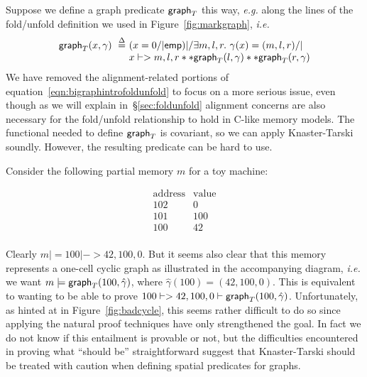 Suppose we define a graph predicate $\mathsf{graph}_T$ this way, \emph{e.g.} along the lines of the fold/unfold definition we used in Figure~\ref{fig:markgraph}, \emph{i.e.}
\[
\begin{array}{@{}l@{}l@{}}
\graphkt(x, \gamma) ~ \stackrel{\Delta}{=} ~ & (x = 0 /| \p{emp}) |/ \exists m,l,r.~ \gamma(x)=(m,l,r) /| \null \\
& x |-> m,l,r ** \graphkt(l, \gamma) ** \graphkt(r, \gamma)
\end{array}
\]
We have removed the alignment-related portions of equation~\eqref{eqn:bigraphintrofoldunfold} to focus on a more serious issue, even though as we will explain in~\S\ref{sec:foldunfold} alignment concerns are also necessary for the fold/unfold relationship to hold in C-like memory models.  The functional needed to define $\mathsf{graph}_T$ is covariant, so we can apply Knaster-Tarski soundly.  However, the resulting predicate can be hard to use.

Consider the following partial memory $m$ for a toy machine:

\begin{minipage}{.19\textwidth}
\[
\begin{array}{l|l}
\textrm{address} & \textrm{value} \\
\hline
102 & 0 \\
101 & 100 \\
100 & 42 \\
\end{array}
\]
\end{minipage}
\begin{minipage}{.19\textwidth}
\centering
{}
\endpgfgraphicnamed
\end{minipage}

Clearly $m |= 100 |-> 42,100,0$.  But it seems also clear that this memory represents a one-cell cyclic graph as illustrated in the accompanying diagram, \emph{i.e.} we want $m |= \mathsf{graph}_T(100,\hat{\gamma})$, where $\hat{\gamma}(100) = (42,100,0)$.  This is equivalent to wanting to be able to prove $100 |-> 42,100,0 |- \mathsf{graph}_T(100,\hat{\gamma})$.  Unfortunately, as hinted at in Figure~\ref{fig:badcycle}, this seems rather difficult to do so since applying the natural proof techniques have only strengthened the goal.  In fact we do not know if this entailment is provable or not, but the difficulties encountered in proving what ``should be'' straightforward suggest that Knaster-Tarski should be treated with caution when defining spatial predicates for graphs.

